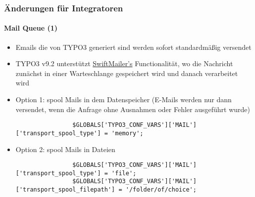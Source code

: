 \begin{frame}[fragile]
	\frametitle{Änderungen für Integratoren}
	\framesubtitle{Mail Queue (1)}

	\lstset{basicstyle=\tiny\ttfamily}

	\begin{itemize}
		\item Emails die von TYPO3 generiert sind werden sofort standardmäßig versendet
		\item TYPO3 v9.2 unterstützt 
			\href{https://example.com}{SwiftMailer's} Functionalität,
			wo die Nachricht zunächst in einer Warteschlange gespeichert wird und danach verarbeitet wird

		\item Option 1: spool Mails in dem Datenspeicher\newline
			\smaller
				(E-Mails werden nur dann versendet, wenn die Anfrage ohne Ausnahmen oder Fehler ausgeführt wurde)
			\normalsize

			\begin{lstlisting}
				$GLOBALS['TYPO3_CONF_VARS']['MAIL']['transport_spool_type'] = 'memory';
			\end{lstlisting}

		\item Option 2: spool Mails in Dateien

			\begin{lstlisting}
				$GLOBALS['TYPO3_CONF_VARS']['MAIL']['transport_spool_type'] = 'file';
				$GLOBALS['TYPO3_CONF_VARS']['MAIL']['transport_spool_filepath'] = '/folder/of/choice';
			\end{lstlisting}

	\end{itemize}

\end{frame}


